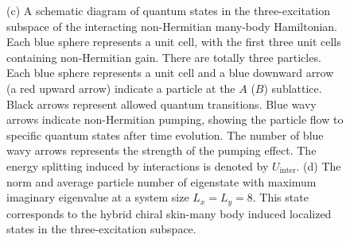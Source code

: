 \documentclass[longbibliography, aps, prx, amsmath, amssymb, amsfonts, twocolumn,superscriptaddress, footinbib]{revtex4-1}
\begin{document}
\begin{figure}[htbp]
{		(c)  A schematic diagram of quantum states in the three-excitation subspace of the interacting non-Hermitian many-body Hamiltonian. Each blue sphere represents a unit cell, with the first three unit cells containing non-Hermitian gain. There are totally three particles.
		Each blue sphere represents a unit cell and a blue downward arrow (a red upward arrow) indicate a particle at the $A$ ($B$) sublattice. Black arrows represent allowed quantum transitions. Blue wavy arrows indicate non-Hermitian pumping, showing the particle flow to specific quantum states after time evolution. The number of blue wavy arrows represents the strength of the pumping effect. The energy splitting induced by interactions is denoted by $U_{\text{inter}}$.
		(d) The norm and average particle number of eigenstate with maximum imaginary eigenvalue at a system size $L_x=L_y=8$. This state corresponds to the hybrid chiral skin-many body induced localized states in the three-excitation subspace.
		}
		\label{fig:03}
	\end{figure}
	
\end{document}
